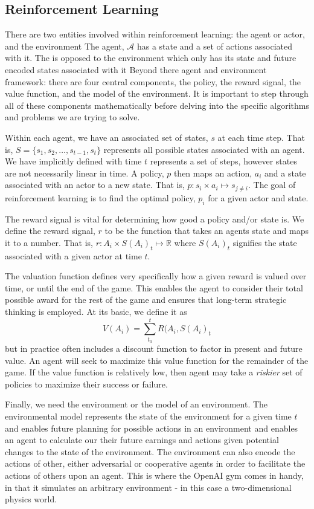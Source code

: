 \documentclass[doc, onecolumn, 12pt]{apa6}
\begin{document}
\subsection{Reinforcement Learning}
There are two entities involved within reinforcement learning: the agent or actor, and the environment The agent, $\mathcal{A}$ has a state and a set of actions associated with it. The is opposed to the environment which only has its state and future encoded states associated with it Beyond there agent and environment framework: there are four central components, the policy, the reward signal, the value function, and the model of the environment. It is important to step through all of these components mathematically before delving into the specific algorithms and problems we are trying to solve. 

Within each agent, we have an associated set of states, $s$ at each time step. That is, $S = \lbrace s_{1}, s_{2}, \ldots, s_{t-1}, s_{t} \rbrace$ represents all possible states associated with an agent. We have implicitly defined with time $t$ represents a set of steps, however states are not necessarily linear in time. A policy, $p$ then maps an action, $a_{i}$ and a state associated with an actor to a new state. That is, $p: s_{i} \times a_{i} \mapsto s_{j \neq i}$. The goal of reinforcement learning is to find the optimal policy, $p_{i}$ for a given actor and state. 


The reward signal is vital for determining how good a policy and/or state is. We define the reward signal, $r$ to be the function that takes an agents state and maps it to a number. That is, $r: A_{i} \times S(A_{i})_{t} \mapsto \mathbb{R}$ where $S(A_{i})_{t}$ signifies the state associated with a given actor at time $t$. 

The valuation function defines very specifically how a given reward is valued over time, or until the end of the game. This enables the agent to consider their total possible award for the rest of the game and ensures that long-term strategic thinking is employed. At its basic, we define it as $$V(A_{i}) = \sum_{t_{a}}^{t} R(A_{i}, S(A_{i})_{t} $$ but in practice often  includes a discount function to factor in present and future value. An agent will seek to maximize this value function for the remainder of the game. If the value function is relatively low, then agent may take a \emph{riskier} set of policies to maximize their success or failure. 

Finally, we need the environment or the model of an environment.  The environmental model represents the state of the environment for a given time $t$ and enables future planning for possible actions in an environment and enables an agent to calculate our their future earnings and actions given potential changes to the state of the environment. The environment can also encode the actions of other, either adversarial or cooperative agents in order to facilitate the actions of others upon an agent. This is where the OpenAI gym comes in handy, in that it simulates an arbitrary environment - in this case a two-dimensional physics world. 
\end{document}
